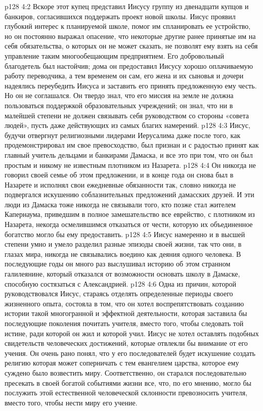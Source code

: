 \vs p128 4:2 Вскоре этот купец представил Иисусу группу из двенадцати купцов и банкиров, согласившихся поддержать проект новой школы. Иисус проявил глубокий интерес к планируемой школе, помог им спланировать ее устройство, но он постоянно выражал опасение, что некоторые другие ранее принятые им на себя обязательства, о которых он не может сказать, не позволят ему взять на себя управление таким многообещающим предприятием. Его добровольный благодетель был настойчив; дома он предоставил Иисусу хорошо оплачиваемую работу переводчика, а тем временем он сам, его жена и их сыновья и дочери надеялись переубедить Иисуса и заставить его принять предложенную ему честь. Но он не соглашался. Он твердо знал, что его миссия на земле не должна пользоваться поддержкой образовательных учреждений; он знал, что ни в малейшей степени не должен связывать себя руководством со стороны «совета людей», пусть даже действующих из самых благих намерений.
\vs p128 4:3 Иисус, будучи отвергнут религиозными лидерами Иерусалима даже после того, как продемонстрировал им свое превосходство, был признан и с радостью принят как главный учитель дельцами и банкирами Дамаска, и все это при том, что он был простым и никому не известным плотником из Назарета.
\vs p128 4:4 Он никогда не говорил своей семье об этом предложении, и в конце года он снова был в Назарете и исполнял свои ежедневные обязанности так, словно никогда не подвергался искушению соблазнительных предложений дамасских друзей. И эти люди из Дамаска тоже никогда не связывали того, кто позже стал жителем Капернаума, приведшим в полное замешательство все еврейство, с плотником из Назарета, некогда осмелившимся отказаться от чести, которую их объединенное богатство могло бы ему предоставить.
\vs p128 4:5 \pc Иисус намеренно и в высшей степени умно и умело разделил разные эпизоды своей жизни, так что они, в глазах мира, никогда не связывались воедино как деяния одного человека. В последующие годы он много раз выслушивал историю об этом странном галилеянине, который отказался от возможности основать школу в Дамаске, способную состязаться с Александрией.
\vs p128 4:6 Одна из причин, которой руководствовался Иисус, стараясь отделять определенные периоды своего жизненного опыта, состояла в том, что он хотел воспрепятствовать созданию истории такой многогранной и эффектной деятельности, которая заставила бы последующие поколения почитать учителя, вместо того, чтобы следовать той истине, ради которой он жил и которой учил. Иисус не хотел оставлять подобных свидетельств человеческих достижений, которые отвлекли бы внимание от его учения. Он очень рано понял, что у его последователей будет искушение создать религию  которая может соперничать с тем евангелием царства, которое ему суждено было возвестить миру. Соответственно, он старался последовательно пресекать в своей богатой событиями жизни все, что, по его мнению, могло бы послужить этой естественной человеческой склонности превозносить учителя, вместо того, чтобы нести миру его учение.
